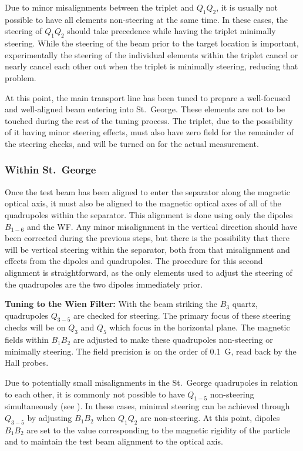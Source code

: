 Due to minor misalignments between the triplet and $Q_1Q_2$, it is
usually not possible to have all elements non-steering at the same time.
In these cases, the steering of $Q_1Q_2$ should take precedence while
having the triplet minimally steering. While the steering of the beam
prior to the target location is important, experimentally the steering
of the individual elements within the triplet cancel or nearly cancel
each other out when the triplet is minimally steering, reducing that
problem.

At this point, the main transport line has been tuned to prepare a
well-focused and well-aligned beam entering into St.\ George. These
elements are not to be touched during the rest of the tuning process.
The triplet, due to the possibility of it having minor steering effects,
must also have zero field for the remainder of the steering checks, and
will be turned on for the actual measurement.

\subsubsection{Within St.\ George}
\label{sec:tuning_stg}

Once the test beam has been aligned to enter the separator along the
magnetic optical axis, it must also be aligned to the magnetic optical
axes of all of the quadrupoles within the separator. This alignment is
done using only the dipoles $B_{1-6}$ and the WF. Any minor misalignment
in the vertical direction should have been corrected during the previous
steps, but there is the possibility that there will be vertical steering
within the separator, both from that misalignment and effects from the
dipoles and quadrupoles. The procedure for this second alignment is
straightforward, as the only elements used to adjust the steering of the
quadrupoles are the two dipoles immediately prior.

\textbf{Tuning to the Wien Filter:}
With the beam striking the $B_3$ quartz, quadrupoles $Q_{3-5}$ are
checked for steering. The primary focus of these steering checks will be
on $Q_3$ and $Q_5$ which focus in the horizontal plane. The magnetic
fields within $B_1B_2$ are adjusted to make these quadrupoles
non-steering or minimally steering. The field precision is on the order
of 0.1~G, read back by the Hall probes.

Due to potentially small misalignments in the St.\ George quadrupoles in
relation to each other, it is commonly not possible to have $Q_{1-5}$
non-steering simultaneously (see \cite{Meisel2017}). In these cases,
minimal steering can be achieved through $Q_{3-5}$ by adjusting $B_1B_2$
when $Q_1Q_2$ are non-steering. At this point, dipoles $B_1B_2$ are set
to the value corresponding to the magnetic rigidity of the particle and
to maintain the test beam alignment to the optical axis.

